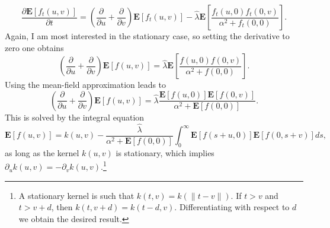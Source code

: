 \[
\frac{\partial \boldsymbol{E}\left[f_t(u,v)\right]}{\partial t} = \left( \frac{\partial }{\partial u}+ \frac{\partial }{\partial v}\right) \boldsymbol{E}\left[f_t(u,v)\right] - \hat{\lambda}\boldsymbol{E} \left[\frac{f_{t}(u,0)f_{t}(0,v)}{\alpha^2+ f_{t}(0,0)}\right].
\]
Again, I am most interested in the stationary case, so setting the derivative to zero one obtains
\begin{equation}
\label{eq:differential_kernel}
\left( \frac{\partial }{\partial u}+ \frac{\partial }{\partial v}\right) \boldsymbol{E}\left[f(u,v)\right] = \hat{\lambda} \boldsymbol{E}\left[\frac{f(u,0)f(0,v)}{\alpha^2+ f(0,0)}\right].
\end{equation}
Using the mean-field approximation leads to
\begin{equation}
\label{eq:kernel_mf}
\left( \frac{\partial }{\partial u}+ \frac{\partial }{\partial v}\right) \boldsymbol{E}\left[f(u,v)\right] = \hat{\lambda} \frac{ \boldsymbol{E}\left[f(u,0)\right]  \boldsymbol{E}\left[f(0,v)\right] }{\alpha^2+  \boldsymbol{E}\left[f(0,0)\right] }.
\end{equation}
This is solved by the integral equation
\begin{equation}
\label{eq:integral_kernel}
\boldsymbol{E}\left[f(u,v)\right] = k(u,v) - \frac{\hat{\lambda}}{\alpha^2+ \boldsymbol{E}\left[f(0,0)\right]} \int_0^\infty \boldsymbol{E}\left[f(s+u,0)\right]\boldsymbol{E}\left[f(0,s+v)\right] ds,
\end{equation}
as long as the kernel $k(u,v)$ is stationary, which implies $\partial_u k(u,v) = - \partial_v k(u,v)$.\footnote{A stationary kernel is such that 
$k(t,v) = k(\|t-v\|)$. If $t > v$ and $t> v+d$, then $k(t,v+d) = k(t-d,v)$. Differentiating with respect to $d$ we obtain the desired result.}\par

